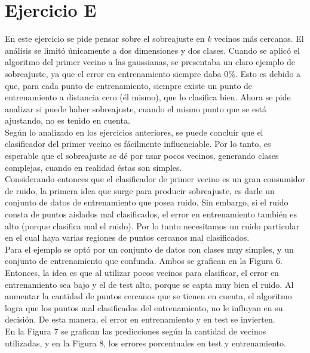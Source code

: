 \documentclass[12pt, a4paper]{article}
\begin{document}
\section*{Ejercicio E}

En este ejercicio se pide pensar sobre el sobreajuste en \textit{k} vecinos más cercanos. El análisis se limitó únicamente a dos dimensiones y dos clases. Cuando se aplicó el algoritmo del primer vecino a las gaussianas, se presentaba un claro ejemplo de sobreajuste, ya que el error en entrenamiento siempre daba 0\%. Esto es debido a que, para cada punto de entrenamiento, siempre existe un punto de entrenamiento a distancia cero (él mismo), que lo clasifica bien. Ahora se pide analizar si puede haber sobreajuste, cuando el mismo punto que se está ajustando, no es tenido en cuenta. \\
Según lo analizado en los ejercicios anteriores, se puede concluír que el clasificador del primer vecino es fácilmente influenciable. Por lo tanto, es esperable que el sobreajuste se dé por usar pocos vecinos, generando clases complejas, cuando en realidad éstas son simples. \\
Considerando entonces que el clasificador de primer vecino es un gran consumidor de ruido, la primera idea que surge para producir sobreajuste, es darle un conjunto de datos de entrenamiento que posea ruido. Sin embargo, si el ruido consta de puntos aislados mal clasificados, el error en entrenamiento también es alto (porque clasifica mal el ruido). Por lo tanto necesitamos un ruido particular en el cual haya varias regiones de puntos cercanos mal clasificados. \\
Para el ejemplo se optó por un conjunto de datos con clases muy simples, y un conjunto de entrenamiento que confunda. Ambos se grafican en la Figura 6. Entonces, la idea es que al utilizar pocos vecinos para clasificar, el error en entrenamiento sea bajo y el de test alto, porque se capta muy bien el ruido. Al aumentar la cantidad de puntos cercanos que se tienen en cuenta, el algoritmo logra que los puntos mal clasificados del entrenamiento, no le influyan en su decisión. De esta manera, el error en entrenamiento y en test se invierten.\\
En la Figura 7 se grafican las predicciones según la cantidad de vecinos utilizadas, y en la Figura 8, los errores porcentuales en test y entrenamiento.
\end{document}
